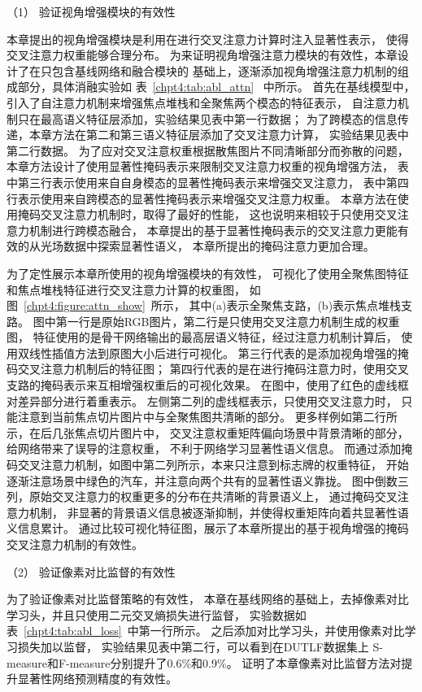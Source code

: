 （1）
验证视角增强模块的有效性


本章提出的视角增强模块是利用在进行交叉注意力计算时注入显著性表示，
使得交叉注意力权重能够合理分布。
为来证明视角增强注意力模块的有效性，本章设计了在只包含基线网络和融合模块的
基础上，逐渐添加视角增强注意力机制的组成部分，具体消融实验如
表~\ref{chpt4:tab:abl_attn}~
中所示。
首先在基线模型中，引入了自注意力机制来增强焦点堆栈和全聚焦两个模态的特征表示，
自注意力机制只在最高语义特征层添加，实验结果见表中第一行数据；
为了跨模态的信息传递，本章方法在第二和第三语义特征层添加了交叉注意力计算，
实验结果见表中第二行数据。
为了应对交叉注意权重根据散焦图片不同清晰部分而弥散的问题，
本章方法设计了使用显著性掩码表示来限制交叉注意力权重的视角增强方法，
表中第三行表示使用来自自身模态的显著性掩码表示来增强交叉注意力，
表中第四行表示使用来自跨模态的显著性掩码表示来增强交叉注意力权重。
本章方法在使用掩码交叉注意力机制时，取得了最好的性能，
这也说明来相较于只使用交叉注意力机制进行跨模态融合，
本章提出的基于显著性掩码表示的交叉注意力更能有效的从光场数据中探索显著性语义，
本章所提出的掩码注意力更加合理。



为了定性展示本章所使用的视角增强模块的有效性，
可视化了使用全聚焦图特征和焦点堆栈特征进行交叉注意力计算的权重图，
如图~\ref{chpt4:figure:attn_show}~所示，
其中(a)表示全聚焦支路，(b)表示焦点堆栈支路。
图中第一行是原始RGB图片，第二行是只使用交叉注意力机制生成的权重图，
特征使用的是骨干网络输出的最高层语义特征，经过注意力机制计算后，
使用双线性插值方法到原图大小后进行可视化。
第三行代表的是添加视角增强的掩码交叉注意力机制后的特征图；
第四行代表的是在进行掩码注意力时，使用交叉支路的掩码表示来互相增强权重后的可视化效果。
在图中，使用了红色的虚线框对差异部分进行着重表示。
左侧第二列的虚线框表示，只使用交叉注意力时，
只能注意到当前焦点切片图片中与全聚焦图共清晰的部分。
更多样例如第二行所示，在后几张焦点切片图片中，
交叉注意权重矩阵偏向场景中背景清晰的部分，给网络带来了误导的注意权重，
不利于网络学习显著性语义信息。
而通过添加掩码交叉注意力机制，如图中第二列所示，本来只注意到标志牌的权重特征，
开始逐渐注意场景中绿色的汽车，并注意向两个共有的显著性语义靠拢。
图中倒数三列，原始交叉注意力的权重更多的分布在共清晰的背景语义上，
通过掩码交叉注意力机制，
非显著的背景语义信息被逐渐抑制，并使得权重矩阵向着共显著性语义信息累计。
通过比较可视化特征图，展示了本章所提出的基于视角增强的掩码交叉注意力机制的有效性。






（2）
验证像素对比监督的有效性

为了验证像素对比监督策略的有效性，
本章在基线网络的基础上，去掉像素对比学习头，并且只使用二元交叉熵损失进行监督，
实验数据如表~\ref{chpt4:tab:abl_loss}~中第一行所示。
之后添加对比学习头，并使用像素对比学习损失加以监督，
实验结果见表中第二行，可以看到在DUTLF数据集上
S-measure和F-measure分别提升了0.6\%和0.9\%。
证明了本章像素对比监督方法对提升显著性网络预测精度的有效性。



